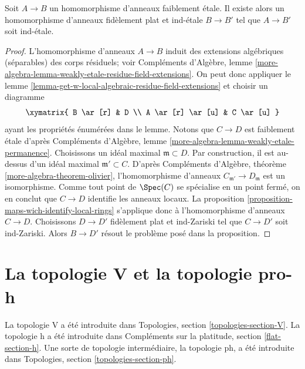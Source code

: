 \begin{proposition}
\label{proposition-weakly-etale}
Soit $A \to B$ un homomorphisme d'anneaux faiblement \'etale.
Il existe alors un homomorphisme d'anneaux fidèlement plat et ind-\'etale
$B \to B'$ tel que $A \to B'$ soit ind-\'etale.
\end{proposition}

\begin{proof}
L'homomorphisme d'anneaux $A \to B$ induit des extensions algébriques (séparables) des
corps résiduels; voir Compléments d'Algèbre, lemme
\ref{more-algebra-lemma-weakly-etale-residue-field-extensions}.
On peut donc appliquer le
lemme \ref{lemma-get-w-local-algebraic-residue-field-extensions}
et choisir un diagramme
$$
\xymatrix{
B \ar[r] & D \\
A \ar[r] \ar[u] & C \ar[u]
}
$$
ayant les propriétés énumérées dans le lemme. Notons que $C \to D$
est faiblement \'etale d'après
Compléments d'Algèbre, lemme \ref{more-algebra-lemma-weakly-etale-permanence}.
Choisissons un idéal maximal $\mathfrak m \subset D$. Par construction,
il est au-dessus d'un idéal maximal $\mathfrak m' \subset C$.
D'après Compléments d'Algèbre, théorème \ref{more-algebra-theorem-olivier},
l'homomorphisme d'anneaux $C_{\mathfrak m'} \to D_\mathfrak m$ est un isomorphisme.
Comme tout point de $\Spec(C)$ se spécialise en un point fermé, on en conclut que
$C \to D$ identifie les anneaux locaux.
La proposition \ref{proposition-maps-wich-identify-local-rings}
s'applique donc à l'homomorphisme d'anneaux $C \to D$. Choisissons $D \to D'$ fidèlement plat
et ind-Zariski tel que $C \to D'$ soit ind-Zariski. Alors
$B \to D'$ résout le problème posé dans la proposition.
\end{proof}





\section{La topologie V et la topologie pro-h}
\label{section-V-versus-pro-h}

\noindent
La topologie V a été introduite dans
Topologies, section \ref{topologies-section-V}.
La topologie h a été introduite dans
Compléments sur la platitude, section \ref{flat-section-h}.
Une sorte de topologie intermédiaire, la topologie ph,
a été introduite dans Topologies, section \ref{topologies-section-ph}.

